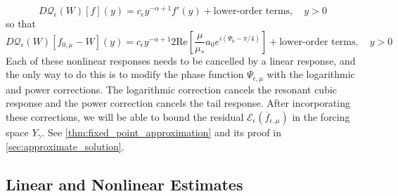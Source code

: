 \documentclass[11pt]{amsart}
\theoremstyle{definition}
\theoremstyle{remark}
\numberwithin{equation}{section}
\newcommand{\mc}[1]{\mathcal{#1}}
\newcommand{\ov}[1]{\overline{#1}}
\begin{document}
\[D\mc{Q}_\epsilon(W)[f](y) = c_\epsilon y^{-\alpha + 1}f'(y) + \text{lower-order terms}, \quad y > 0\]
so that
\[D\mc{Q}_\epsilon(W)[f_{0,\mu} - W](y) = c_\epsilon y^{-\alpha + 1} 2\text{Re}\left[\frac{\mu}{\mu_*}a_0 e^{i(\Psi_{0} - \pi/4)}\right] + \text{lower-order terms}, \quad y > 0\]
Each of these nonlinear responses needs to be cancelled by a linear response, and the only way to do this is to modify the phase function $\Psi_{\epsilon, \mu}$ with the logarithmic and power corrections. The logarithmic correction cancels the resonant cubic response and the power correction cancels the tail response. After incorporating these corrections, we will be able to bound the residual $\mc{E}_\epsilon(\ov{f}_{\epsilon, \mu})$ in the forcing space $Y_\gamma$. See \cref{thm:fixed_point_approximation} and its proof in \cref{sec:approximate_solution}.

\subsection{Linear and Nonlinear Estimates}
\end{document}
